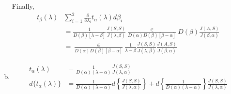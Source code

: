 \begin{enumerate}[a)]
  Finally,\pageoriginale
  \begin{align*}
  t_\beta (\lambda ) & \sum^2_{i=1} \frac{\partial}{\partial \lambda_i}
  t_\alpha (\lambda ) d \beta_i\\
    & = \frac{1}{D(\beta )[\lambda - \beta ]} \frac{J(S, S)}
    {J(\lambda,  \beta )} \frac{\in} {D(\alpha ) D(\beta )[\beta -
        \alpha]} D(\beta ) \frac{J(A, S)} {J(\beta,  \alpha )}\\ 
    & = \frac{\in} {D(\alpha ) D(\beta ) [\beta - \alpha ]}
    \frac{1}{\lambda - \beta}  \frac{J(S, S)} {J(\lambda,  \beta )}
    \frac{J(A, S)} {J(\beta,  \alpha )} 
  \end{align*}
\item \pageoriginale
  \begin{align*}
    t_\alpha (\lambda ) & =  \frac{1}{D (\alpha )(\lambda - \alpha )}
    \frac{J(S, S)} {J(\lambda,  \alpha)}   \\ 
    d\big\{t_\alpha (\lambda )\big\} & =  \frac{1}{D(\alpha ) (\lambda -
      \alpha )}  d \left\{ \frac{J(S, S)} {J(\lambda,  \alpha )}
    \right\} + d \left\{  \frac{1}{D(\alpha ) (\lambda - \alpha )}\right\}
    \frac{J(S, S)} {J(\lambda,  \alpha )} 
  \end{align*}
\end{enumerate}

